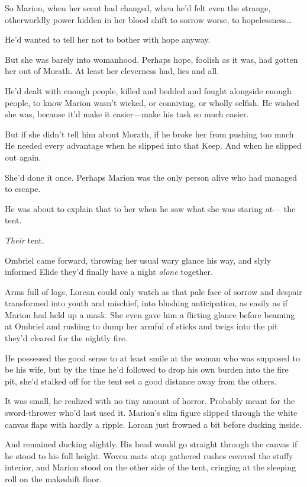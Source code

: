 So Marion, when her scent had changed, when he'd felt even the strange, otherworldly power hidden in her blood shift to sorrow  worse, to hopelessness\ldots{}

He'd wanted to tell her not to bother with hope anyway.

But she was barely into womanhood. Perhaps hope, foolish as it was, had gotten her out of Morath. At least her cleverness had, lies and all.

He'd dealt with enough people, killed and bedded and fought alongside enough people, to know Marion wasn't wicked, or conniving, or wholly selfish. He wished she was, because it'd make it easier---make his task so much easier.

But if she didn't tell him about Morath, if he broke her from pushing too much  He needed every advantage when he slipped into that Keep. And when he slipped out again.

She'd done it once. Perhaps Marion was the only person alive who had managed to escape.

He was about to explain that to her when he saw what she was staring at--- the tent.

\emph{Their} tent.

Ombriel came forward, throwing her usual wary glance his way, and slyly informed Elide they'd finally have a night \emph{alone} together.

Arms full of logs, Lorcan could only watch as that pale face of sorrow and despair transformed into youth and mischief, into blushing anticipation, as easily as if Marion had held up a mask. She even gave him a flirting glance before beaming at Ombriel and rushing to dump her armful of sticks and twigs into the pit they'd cleared for the nightly fire.

He possessed the good sense to at least smile at the woman who was supposed to be his wife, but by the time he'd followed to drop his own burden into the fire pit, she'd stalked off for the tent set a good distance away from the others.

It was small, he realized with no tiny amount of horror. Probably meant for the sword-thrower who'd last used it. Marion's slim figure slipped through the white canvas flaps with hardly a ripple. Lorcan just frowned a bit before ducking inside.

And remained ducking slightly. His head would go straight through the canvas if he stood to his full height. Woven mats atop gathered rushes covered the stuffy interior, and Marion stood on the other side of the tent, cringing at the sleeping roll on the makeshift floor.

